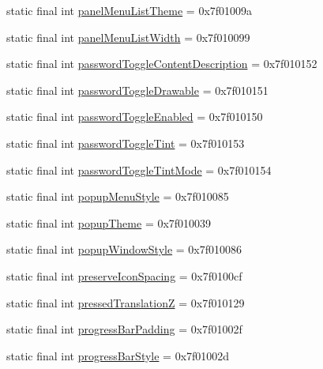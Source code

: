 \begin{CompactItemize}
\item 
static final int \hyperlink{classandroid_1_1support_1_1mediacompat_1_1_r_1_1attr_40838b8e94fe54ea3918d3e1b468fb9a}{panelMenuListTheme} = 0x7f01009a
\item 
static final int \hyperlink{classandroid_1_1support_1_1mediacompat_1_1_r_1_1attr_edfe8d667c9f50cbd9e1b61e6969cf11}{panelMenuListWidth} = 0x7f010099
\item 
static final int \hyperlink{classandroid_1_1support_1_1mediacompat_1_1_r_1_1attr_29138538bd7ce1c48d1fb5dee74ba6c7}{passwordToggleContentDescription} = 0x7f010152
\item 
static final int \hyperlink{classandroid_1_1support_1_1mediacompat_1_1_r_1_1attr_0a309ba4bc11bea14e30adbd1a34dfda}{passwordToggleDrawable} = 0x7f010151
\item 
static final int \hyperlink{classandroid_1_1support_1_1mediacompat_1_1_r_1_1attr_d440c2ef8beced26c0f03105aa9e8ebb}{passwordToggleEnabled} = 0x7f010150
\item 
static final int \hyperlink{classandroid_1_1support_1_1mediacompat_1_1_r_1_1attr_c72578448c1110c4c782cae95a73edd5}{passwordToggleTint} = 0x7f010153
\item 
static final int \hyperlink{classandroid_1_1support_1_1mediacompat_1_1_r_1_1attr_4db182a4bb703bdfc83fcb51931c409c}{passwordToggleTintMode} = 0x7f010154
\item 
static final int \hyperlink{classandroid_1_1support_1_1mediacompat_1_1_r_1_1attr_7bd4bdd9aada89cca50f227207b99c02}{popupMenuStyle} = 0x7f010085
\item 
static final int \hyperlink{classandroid_1_1support_1_1mediacompat_1_1_r_1_1attr_c3edefcbf0340d07a2913a610e73900e}{popupTheme} = 0x7f010039
\item 
static final int \hyperlink{classandroid_1_1support_1_1mediacompat_1_1_r_1_1attr_1f865294832613e200f8bf5ea2fd9a02}{popupWindowStyle} = 0x7f010086
\item 
static final int \hyperlink{classandroid_1_1support_1_1mediacompat_1_1_r_1_1attr_99ce726e8434f024bd798a154a625f84}{preserveIconSpacing} = 0x7f0100cf
\item 
static final int \hyperlink{classandroid_1_1support_1_1mediacompat_1_1_r_1_1attr_2a9b88e8b1814f6e5c11998472e47388}{pressedTranslationZ} = 0x7f010129
\item 
static final int \hyperlink{classandroid_1_1support_1_1mediacompat_1_1_r_1_1attr_a289072bcd83b0f0da303e8ac1386d5d}{progressBarPadding} = 0x7f01002f
\item 
static final int \hyperlink{classandroid_1_1support_1_1mediacompat_1_1_r_1_1attr_db04b73363ed74356354b97c0a509ece}{progressBarStyle} = 0x7f01002d

\end{CompactItemize}
